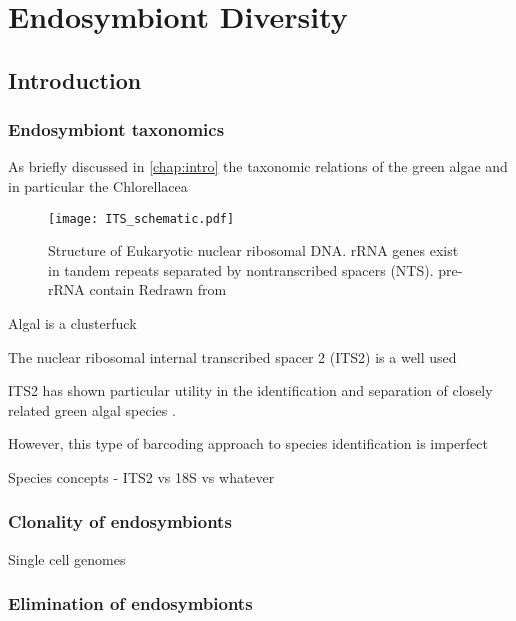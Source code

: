 % 
\graphicspath{{chapters/3.Chapter_1/figures}}

\chapter{Endosymbiont Diversity}\label{chap:endo_diversity}

\section{Introduction}

\subsection{Endosymbiont taxonomics}

As briefly discussed in \ref{chap:intro} the taxonomic relations
of the green algae and in particular the Chlorellacea 



\begin{figure}[h]
    \texttt{[image: ITS\_schematic.pdf]}
    \caption{Structure of Eukaryotic nuclear ribosomal DNA.
        rRNA genes exist in tandem repeats separated by nontranscribed spacers (NTS).
        pre-rRNA contain 
    Redrawn from \citep{}}
    \label{fig;its2_schematic]}
\end{figure}



Algal is a clusterfuck

The nuclear ribosomal internal transcribed spacer 2 (ITS2) is a well used


ITS2 has shown particular utility in the identification and separation
of closely related green algal species \citep{Buchheim2011}.


However, this type of barcoding approach to species identification is 
imperfect 



Species concepts  - ITS2 vs 18S vs whatever \citep{Boenigk2012}

\subsection{Clonality of endosymbionts}

Single cell genomes






\subsection{Elimination of endosymbionts}



